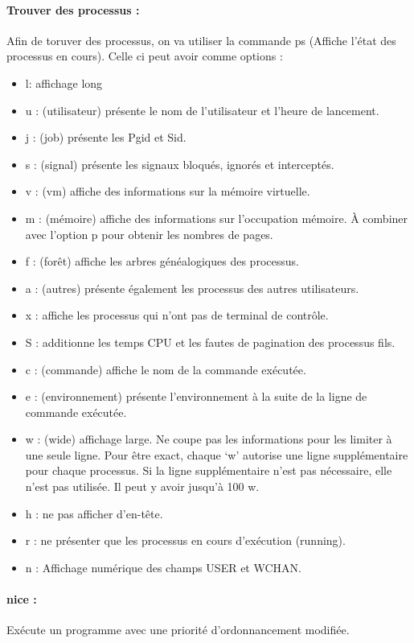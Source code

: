 \documentclass{article}[12pt]
\begin{document}
\paragraph{Trouver des processus : } Afin de toruver des processus, on va utiliser la commande ps (Affiche l'état des processus en cours). Celle ci peut avoir comme options : 
\begin{itemize}
\item l: affichage long
\item u : (utilisateur) présente le nom de l'utilisateur et l'heure de lancement.
\item j : (job) présente les Pgid et Sid.
\item s : (signal) présente les signaux bloqués, ignorés et interceptés.
\item v : (vm) affiche des informations sur la mémoire virtuelle.
\item m : (mémoire) affiche des informations sur l'occupation mémoire. À combiner avec l'option p pour obtenir les nombres de pages.
\item f : (forêt) affiche les arbres généalogiques des processus.
\item a : (autres) présente également les processus des autres utilisateurs.
\item x : affiche les processus qui n'ont pas de terminal de contrôle.
\item S : additionne les temps CPU et les fautes de pagination des processus fils.
\item c : (commande) affiche le nom de la commande exécutée.
\item e : (environnement) présente l'environnement à la suite de la ligne de commande exécutée.
\item w : (wide) affichage large. Ne coupe pas les informations pour les limiter à une seule ligne. Pour être exact, chaque `w' autorise une ligne supplémentaire pour chaque processus. Si la ligne supplémentaire n'est pas nécessaire, elle n'est pas utilisée. Il peut y avoir jusqu'à 100 w.
\item h : ne pas afficher d'en-tête.
\item r : ne présenter que les processus en cours d'exécution (running).
\item n : Affichage numérique des champs USER et WCHAN.
\end{itemize}
\paragraph{nice : } Exécute un programme avec une priorité d'ordonnancement modifiée.  
\end{document}
